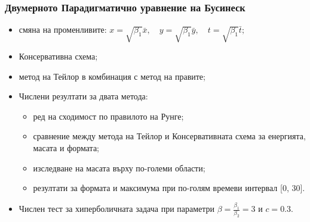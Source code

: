 \documentclass{beamer}
\begin{document}



\begin{frame}
\frametitle{Двумерното Парадигматично уравнение на Бусинеск}
 
\begin{itemize}
  \item смяна на променливите:
$
x = \sqrt{\beta_1} \bar{x}, \quad y = \sqrt{\beta_1} \bar{y}, \quad t = \sqrt{\beta_1} \bar{t};
$
  \item Консервативна схема;
  \item метод на Тейлор в комбинация с метод на правите;
  \item Числени резултати за двата метода:
  \begin{itemize}
	  \item ред на сходимост по правилото на Рунге;  
	  \item сравнение между метода на Тейлор и Консервативната схема за енергията, масата и формата;
	  \item изследване на масата върху по-големи области;
	  \item резултати за формата и максимума при по-голям времеви интервал [0, 30].
	\end{itemize}
  \item Числен тест за хиперболичната задача при параметри $\beta = \frac{\beta_1}{\beta_2} = 3$ и $c=0.3$.
\end{itemize}

\end{frame}
\end{document}
